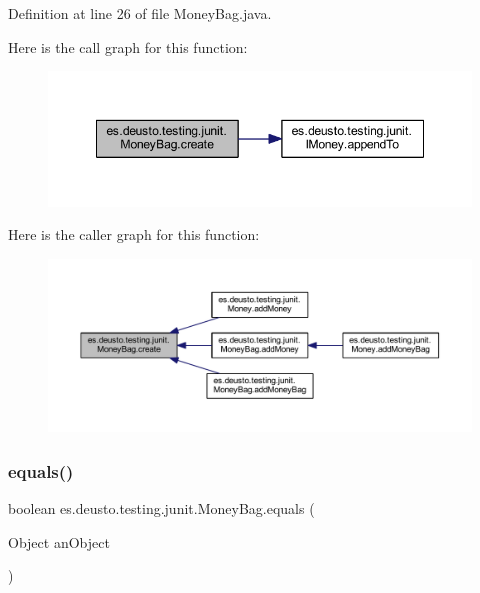 Definition at line 26 of file Money\+Bag.\+java.

Here is the call graph for this function\+:
\nopagebreak
\begin{figure}[H]
\begin{center}
\leavevmode
\includegraphics[width=348pt]{classes_1_1deusto_1_1testing_1_1junit_1_1_money_bag_a8d2d54a342d2de2b75530600123efc9a_cgraph}
\end{center}
\end{figure}
Here is the caller graph for this function\+:
\nopagebreak
\begin{figure}[H]
\begin{center}
\leavevmode
\includegraphics[width=350pt]{classes_1_1deusto_1_1testing_1_1junit_1_1_money_bag_a8d2d54a342d2de2b75530600123efc9a_icgraph}
\end{center}
\end{figure}
\mbox{\label{classes_1_1deusto_1_1testing_1_1junit_1_1_money_bag_a80926d10c9619bd2ad84eabe52ca03bb}} 
\subsubsection{\texorpdfstring{equals()}{equals()}}
{\footnotesize\ttfamily boolean es.\+deusto.\+testing.\+junit.\+Money\+Bag.\+equals (\begin{DoxyParamCaption}\item[{Object}]{an\+Object }\end{DoxyParamCaption})}




